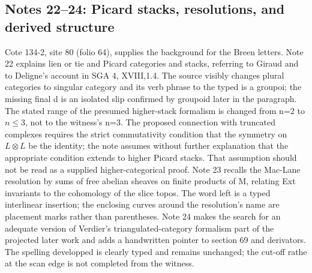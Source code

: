 \subsection*{Notes 22--24: Picard stacks, resolutions, and derived structure}
Cote 134-2, site 80 (folio 64), supplies the background for the Breen letters. Note 22 explains lien or tie and Picard categories and stacks, referring to Giraud and to Deligne's account in SGA 4, XVIII,1.4. The source visibly changes plural categories to singular category and its verb phrase to the typed is a groupoi; the missing final d is an isolated slip confirmed by groupoid later in the paragraph. The stated range of the presumed higher-stack formalism is changed from n=2 to $n\leq3$, not to the witness's n=3. The proposed connection with truncated complexes requires the strict commutativity condition that the symmetry on $L\otimes L$ be the identity; the note assumes without further explanation that the appropriate condition extends to higher Picard stacks. That assumption should not be read as a supplied higher-categorical proof. Note 23 recalls the Mac-Lane resolution by sums of free abelian sheaves on finite products of M, relating Ext invariants to the cohomology of the slice topos. The word left is a typed interlinear insertion; the enclosing curves around the resolution's name are placement marks rather than parentheses. Note 24 makes the search for an adequate version of Verdier's triangulated-category formalism part of the projected later work and adds a handwritten pointer to section 69 and derivators. The spelling developped is clearly typed and remains unchanged; the cut-off rathe at the scan edge is not completed from the witness.


